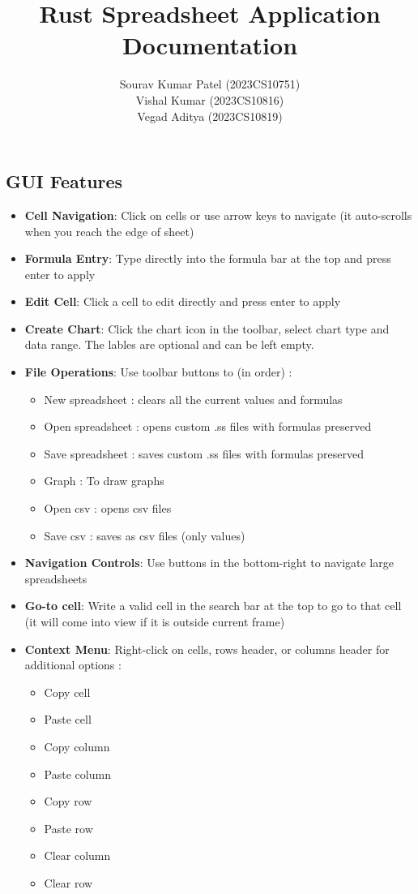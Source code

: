\documentclass[12pt]{article}
\title{\textbf{Rust Spreadsheet Application Documentation}}
\author{Sourav Kumar Patel (2023CS10751) \\ Vishal Kumar (2023CS10816) \\ Vegad Aditya (2023CS10819)}
\begin{document}
\maketitle
\subsection*{GUI Features}
\begin{itemize}
    \item \textbf{Cell Navigation}: Click on cells or use arrow keys to navigate (it auto-scrolls when you reach the edge of sheet)
    \item \textbf{Formula Entry}: Type directly into the formula bar at the top and press enter to apply
    \item \textbf{Edit Cell}: Click a cell to edit directly and press enter to apply
    \item \textbf{Create Chart}: Click the chart icon in the toolbar, select chart type and data range. The lables are optional and can be left empty.
    \item \textbf{File Operations}: Use toolbar buttons to (in order) :
    \begin{itemize}
    \item New spreadsheet : clears all the current values and formulas
    \item Open spreadsheet : opens custom .ss files with formulas preserved
    \item Save spreadsheet : saves custom .ss files with formulas preserved
    \item Graph : To draw graphs
    \item Open csv : opens csv files
    \item Save csv : saves as csv files (only values)
    \end{itemize}
    
    \item \textbf{Navigation Controls}: Use buttons in the bottom-right to navigate large spreadsheets
    \item \textbf{Go-to cell}: Write a valid cell in the search bar at the top to go to that cell (it will come into view if it is outside current frame)
    \item \textbf{Context Menu}: Right-click on cells, rows header, or columns header for additional options : 
    \begin{itemize}
    \item Copy cell
    \item Paste cell
    \item Copy column
    \item Paste column
    \item Copy row
    \item Paste row
    \item Clear column
    \item Clear row
    \end{itemize}
\end{itemize}
\end{document}
